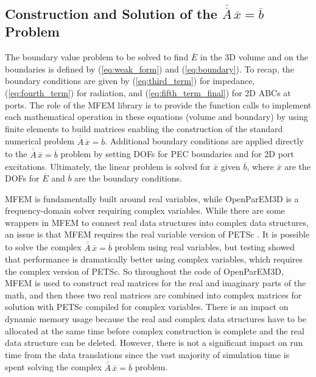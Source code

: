 \documentclass[titlepage]{article}
\renewcommand\_{\textunderscore\linebreak[1]}
\begin{document}
\subsection{Construction and Solution of the $\overline{\overline{A}}\,\overline{x}=\overline{b}$ Problem}

The boundary value problem to be solved to find $\overline{E}$ in the 3D volume and on the boundaries is defined by (\ref{eq:weak_form}) and (\ref{eq:boundary}).  To recap, the boundary conditions are given by (\ref{eq:third_term}) for impedance, (\ref{eq:fourth_term}) for radiation, and (\ref{eq:fifth_term_final}) for 2D ABCs at ports.  The role of the MFEM library is to provide the function calls to implement each mathematical operation in these equations (volume and boundary) by using finite elements to build matrices enabling the construction of the standard numerical problem $\overline{\overline{A}}\,\overline{x}=\overline{b}$.  Additional boundary conditions are applied directly to the $\overline{\overline{A}}\,\overline{x}=\overline{b}$ problem by setting DOFs for PEC boundaries and for 2D port excitations.  Ultimately, the linear problem is solved for $\overline{x}$ given $\overline{b}$, where $\overline{x}$ are the DOFs for $\overline{E}$ and $\overline{b}$ are the boundary conditions.

MFEM is fundamentally built around real variables, while OpenParEM3D is a frequency-domain solver requiring complex variables. While there are some wrappers in MFEM to connect real data structures into complex data structures, an issue is that MFEM requires the real variable version of PETSc \cite{PETSc}.  It is possible to solve the complex $\overline{\overline{A}}\,\overline{x}=\overline{b}$ problem using real variables, but testing showed that performance is dramatically better using complex variables, which requires the complex version of PETSc. So throughout the code of OpenParEM3D, MFEM is used to construct real matrices for the real and imaginary parts of the math, and then these two real matrices are combined into complex matrices for solution with PETSc compiled for complex variables.  There is an impact on dynamic memory usage because the real and complex data structures have to be allocated at the same time before complex construction is complete and the real data structure can be deleted.  However, there is not a significant impact on run time from the data translations since the vast majority of simulation time is spent solving the complex $\overline{\overline{A}}\,\overline{x}=\overline{b}$ problem.
\end{document}
